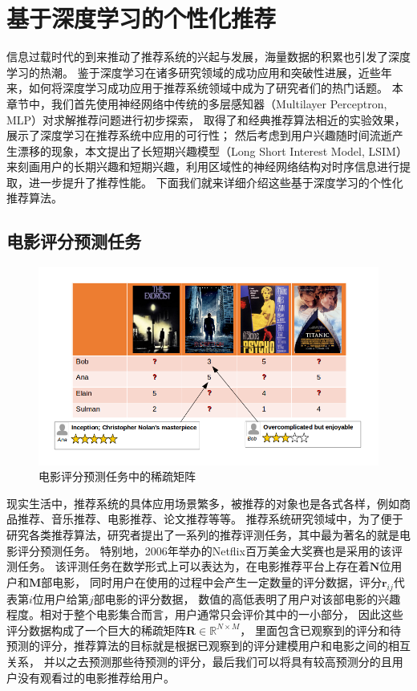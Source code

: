 \chapter{基于深度学习的个性化推荐}
信息过载时代的到来推动了推荐系统的兴起与发展，海量数据的积累也引发了深度学习的热潮。
鉴于深度学习在诸多研究领域的成功应用和突破性进展，近些年来，如何将深度学习成功应用于推荐系统领域中成为了研究者们的热门话题。
本章节中，我们首先使用神经网络中传统的多层感知器（Multilayer Perceptron, MLP）对求解推荐问题进行初步探索，
取得了和经典推荐算法相近的实验效果，展示了深度学习在推荐系统中应用的可行性；
然后考虑到用户兴趣随时间流逝产生漂移的现象，本文提出了长短期兴趣模型（Long Short Interest Model, LSIM）
来刻画用户的长期兴趣和短期兴趣，利用区域性的神经网络结构对时序信息进行提取，进一步提升了推荐性能。
下面我们就来详细介绍这些基于深度学习的个性化推荐算法。

\section{电影评分预测任务}
\begin{figure}[htbp]
\centering
\includegraphics[scale=0.6]{images/task1.png}
\caption{电影评分预测任务中的稀疏矩阵}
\label{fig:task1}
\end{figure}

现实生活中，推荐系统的具体应用场景繁多，被推荐的对象也是各式各样，例如商品推荐、音乐推荐、电影推荐、论文推荐等等。
推荐系统研究领域中，为了便于研究各类推荐算法，研究者提出了一系列的推荐评测任务，其中最为著名的就是电影评分预测任务。
特别地，2006年举办的Netflix百万美金大奖赛也是采用的该评测任务。
该评测任务在数学形式上可以表达为，在电影推荐平台上存在着$\mathbf{N}$位用户和$\mathbf{M}$部电影，
同时用户在使用的过程中会产生一定数量的评分数据，评分$\mathbf{r}_{ij}$代表第$i$位用户给第$j$部电影的评分数据，
数值的高低表明了用户对该部电影的兴趣程度。相对于整个电影集合而言，用户通常只会评价其中的一小部分，
因此这些评分数据构成了一个巨大的稀疏矩阵$\mathbf{R} \in \mathbb{R}^{N \times M}$，
里面包含已观察到的评分和待预测的评分，推荐算法的目标就是根据已观察到的评分建模用户和电影之间的相互关系，
并以之去预测那些待预测的评分，最后我们可以将具有较高预测分的且用户没有观看过的电影推荐给用户。

